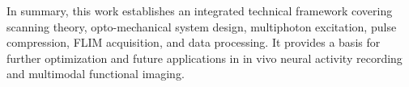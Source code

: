 In summary, this work establishes an integrated technical framework covering scanning theory, opto-mechanical system design, multiphoton excitation, pulse compression, FLIM acquisition, and data processing. It provides a basis for further optimization and future applications in in vivo neural activity recording and multimodal functional imaging.


\pagestyle{enfrontmatterstyle}%
\cleardoublepage\pagestyle{frontmatterstyle}%

